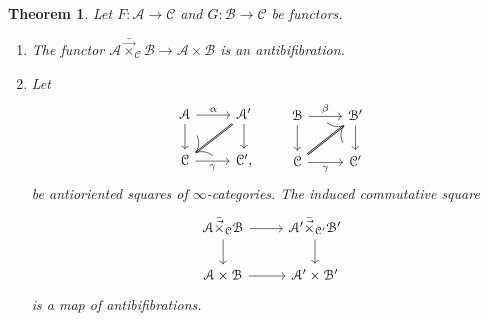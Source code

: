 \documentclass[10pt,oneside]{article}
\numberwithin{equation}{section} %
\numberwithin{figure}{section} %
\theoremstyle{plain}
\newtheorem{theorem}{Theorem}[subsection]
\theoremstyle{definition}
\newcommand{\mA}{{\mathcal A}}
\newcommand{\mB}{{\mathcal B}}
\newcommand{\mC}{{\mathcal C}}
\begin{document}
\begin{theorem}\label{targetfi}
Let $F: \mA \to \mC$ and  $G: \mB \to \mC$ be functors.

\begin{enumerate}[\normalfont(1)]\setlength{\itemsep}{-2pt}
\item The functor $ \mA {\bar{\vec{\times}}}_{\mC} \mB \to \mA \times \mB $
is an antibifibration.

\item Let
$$
\begin{tikzcd}
\mA \ar{r}{\alpha} \ar{d}[swap]{} & \mA' \ar[double]{dl}{} \ar{d}{} \\
\mC  \ar{r}[swap]{\gamma} & \mC',
\end{tikzcd}
\qquad
\begin{tikzcd}
\mB \ar{r}{\beta} \ar{d}[swap]{} & \mB'  \ar{d}{} \\
\mC \ar[double]{ur}{} \ar{r}[swap]{\gamma} & \mC'
\end{tikzcd}
$$
be antioriented squares of $\infty$-categories.
The induced commutative square
\begin{equation}\label{sqfibb}
\begin{tikzcd}
\mA {\bar{\vec{\times}}}_{\mC} \mB \ar{r}{} \ar{d}[swap]{} & \mA' {\bar{\vec{\times}}}_{\mC'} \mB' \ar{d}{} \\
\mA \times \mB  \ar{r}[swap]{} & \mA' \times \mB'
\end{tikzcd}
\end{equation}
is a map of antibifibrations.
\end{enumerate}
\end{theorem}
\end{document}
